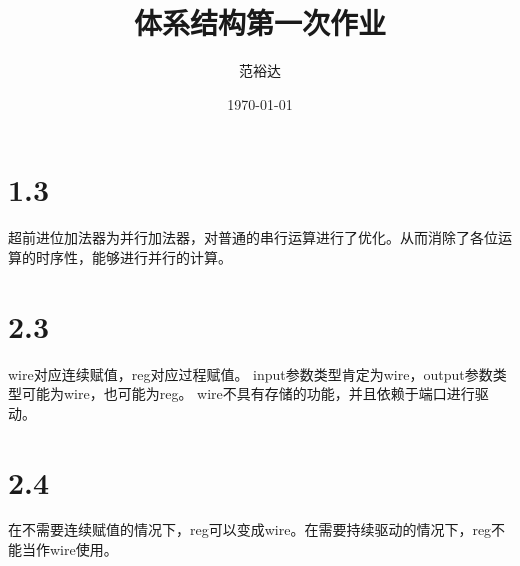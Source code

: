 \documentclass{article}
\begin{document}
\title{体系结构第一次作业}
\author{范裕达}
\date{\today}
\maketitle
\section{1.3}
超前进位加法器为并行加法器，对普通的串行运算进行了优化。从而消除了各位运算的时序性，能够进行并行的计算。
\section{2.3}
wire对应连续赋值，reg对应过程赋值。
input参数类型肯定为wire，output参数类型可能为wire，也可能为reg。
wire不具有存储的功能，并且依赖于端口进行驱动。
\section{2.4}
在不需要连续赋值的情况下，reg可以变成wire。在需要持续驱动的情况下，reg不能当作wire使用。
\end{document}
